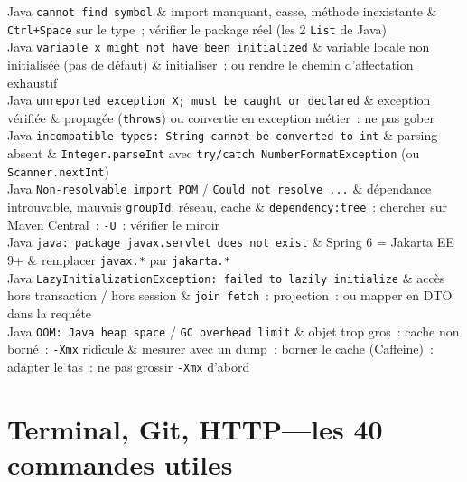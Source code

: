 \begin{tablez}
  Java \verb|cannot find symbol| \& import manquant, casse, m\'ethode inexistante \& \verb|Ctrl+Space| sur le type~; v\'erifier le package r\'eel (les 2 \verb|List| de Java) \\
  Java \verb|variable x might not have been initialized| \& variable locale non initialis\'ee (pas de d\'efaut) \& initialiser~: ou rendre le chemin d'affectation exhaustif \\
  Java \verb|unreported exception X; must be caught or declared| \& exception v\'erifi\'ee \& propag\'ee (\verb|throws|) ou convertie en exception m\'etier~: ne pas gober \\
  Java \verb|incompatible types: String cannot be converted to int| \& parsing absent \& \verb|Integer.parseInt| avec \verb|try/catch NumberFormatException| (ou \verb|Scanner.nextInt|) \\
  Java \verb|Non-resolvable import POM| / \verb|Could not resolve ...| \& d\'ependance introuvable, mauvais \verb|groupId|, r\'eseau, cache \& \verb|dependency:tree|~: chercher sur Maven Central~: \verb|-U|~: v\'erifier le miroir \\
  Java \verb|java: package javax.servlet does not exist| \& Spring 6 = Jakarta EE 9+ \& remplacer \verb|javax.*| par \verb|jakarta.*| \\
  Java \verb|LazyInitializationException: failed to lazily initialize| \& acc\`es hors transaction / hors session \& \verb|join fetch|~: projection~: ou mapper en DTO dans la requ\^ete \\
  Java \verb|OOM: Java heap space| / \verb|GC overhead limit| \& objet trop gros~: cache non born\'e~: \verb|-Xmx| ridicule \& mesurer avec un dump~: borner le cache (Caffeine)~: adapter le tas~: ne pas grossir \verb|-Xmx| d'abord \\
\end{tablez}

\section{Terminal, Git, HTTP---les 40 commandes utiles}

